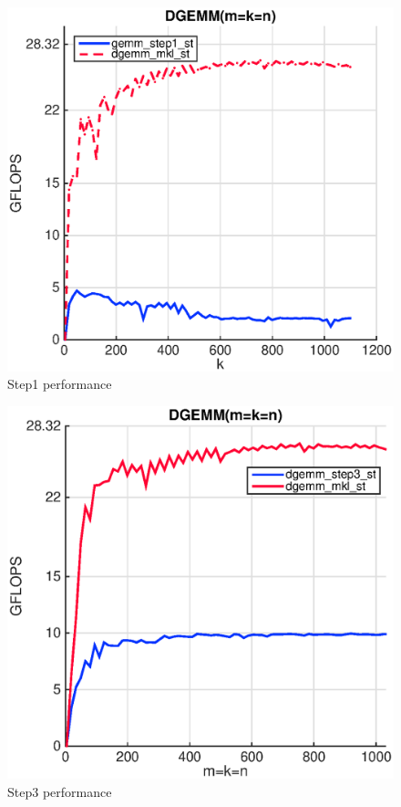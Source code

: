\begin{figure}[!htp]
  \centering
  \includegraphics[scale=.5]{figures/step1_single_thread_ivy.eps}
  \caption{Step1 performance}
  \label{fig:naive}
\end{figure} 

\begin{figure}[!htp]
  \centering
  \includegraphics[scale=.5]{figures/step3_single_thread_ivy.eps}
  \caption{Step3 performance}
  \label{fig:packing}
\end{figure} 

